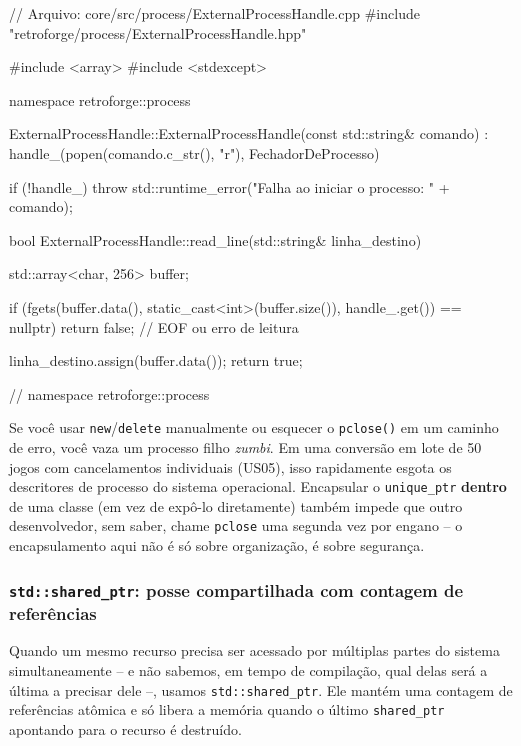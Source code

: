 \begin{CaixaCodigo}
// Arquivo: core/src/process/ExternalProcessHandle.cpp
#include "retroforge/process/ExternalProcessHandle.hpp"

#include <array>
#include <stdexcept>

namespace retroforge::process {

ExternalProcessHandle::ExternalProcessHandle(const std::string& comando)
    : handle_(popen(comando.c_str(), "r"), FechadorDeProcesso{}) {

    if (!handle_) {
        throw std::runtime_error("Falha ao iniciar o processo: " + comando);
    }
}

bool ExternalProcessHandle::read_line(std::string& linha_destino) {
    std::array<char, 256> buffer{};

    if (fgets(buffer.data(), static_cast<int>(buffer.size()), handle_.get()) == nullptr) {
        return false; // EOF ou erro de leitura
    }

    linha_destino.assign(buffer.data());
    return true;
}

} // namespace retroforge::process
\end{CaixaCodigo}

\begin{CaixaAlerta}
Se você usar \texttt{new}/\texttt{delete} manualmente ou esquecer o \texttt{pclose()} em um caminho de erro, você vaza um processo filho \textit{zumbi}. Em uma conversão em lote de 50 jogos com cancelamentos individuais (US05), isso rapidamente esgota os descritores de processo do sistema operacional. Encapsular o \texttt{unique\_ptr} \textbf{dentro} de uma classe (em vez de expô-lo diretamente) também impede que outro desenvolvedor, sem saber, chame \texttt{pclose} uma segunda vez por engano -- o encapsulamento aqui não é só sobre organização, é sobre segurança.
\end{CaixaAlerta}

\subsubsection{\texttt{std::shared\_ptr}: posse compartilhada com contagem de referências}

Quando um mesmo recurso precisa ser acessado por múltiplas partes do sistema simultaneamente -- e não sabemos, em tempo de compilação, qual delas será a última a precisar dele --, usamos \texttt{std::shared\_ptr}. Ele mantém uma contagem de referências atômica e só libera a memória quando o último \texttt{shared\_ptr} apontando para o recurso é destruído.

